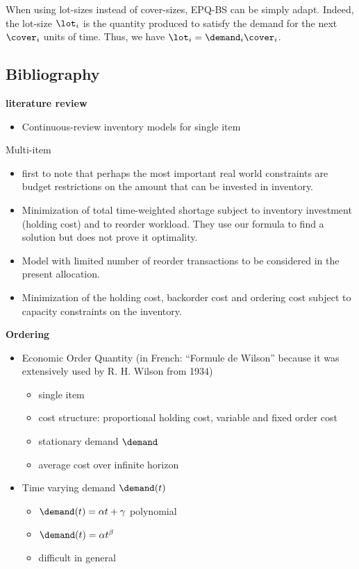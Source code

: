\medskip


When using lot-sizes instead of cover-sizes, EPQ-BS can be simply adapt.
Indeed, the lot-size $\lot_i$ is the quantity produced to satisfy the demand for the next $\cover_i$ units of time.
Thus, we have $\lot_i=\demand_i\cover_i$.


\subsection{Bibliography}

\textbf{literature review}

\begin{itemize}
   \item \cite{Gayon2016} Continuous-review inventory models for single item
\end{itemize} 

Multi-item

\begin{itemize}
  \item \cite{Hadley1963} first to note that perhaps the most important real world constraints are budget restrictions on the amount that can be invested in inventory.
  \item \cite{Schrady1971} Minimization of total time-weighted shortage subject to inventory investment (holding cost) and to reorder workload.
  They use our formula to find a solution but does not prove it optimality.
  \item \cite{Daeschner1975} Model with limited number of reorder transactions to be considered in the present allocation.
  \item \cite{Ohno2001} Minimization of the holding cost, backorder cost and ordering cost subject to capacity constraints on the inventory.
\end{itemize}


\medskip

\textbf{Ordering}

\begin{itemize}
  \item \cite{Harris1913} Economic Order Quantity (in French: ``Formule de Wilson'' because it was extensively used by R. H. Wilson from 1934)
  \begin{itemize}
    \item single item
    \item cost structure: proportional holding cost, variable and fixed order cost
    \item stationary demand $\demand$
    \item average cost over infinite horizon
  \end{itemize}
  \item Time varying demand $\demand(t)$
  \begin{itemize}
    \item \cite{Resh1976,Donaldson1977} $\demand(t)=\alpha t+\gamma$ polynomial
    \item \cite{Barbosa1978} $\demand(t)=\alpha t^{\beta}$
    \item difficult in general
  \end{itemize}
\end{itemize}


